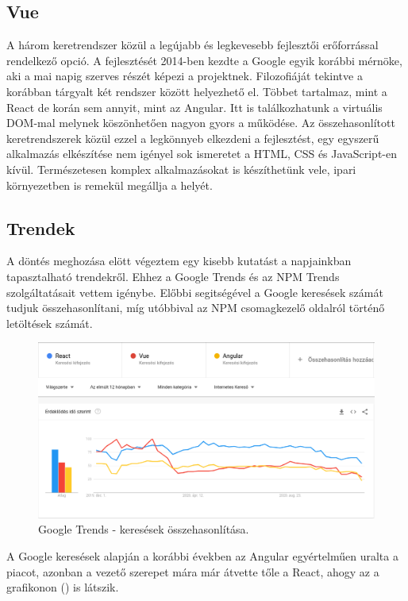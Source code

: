 \subsection{Vue}
A három keretrendszer közül a legújabb és legkevesebb fejlesztői erőforrással rendelkező opció.
A fejlesztését 2014-ben kezdte a Google egyik korábbi mérnöke, aki a mai napig szerves részét képezi a projektnek.
Filozofiáját tekintve a korábban tárgyalt két rendszer között helyezhető el. Többet tartalmaz, mint a React de korán sem annyit, mint az Angular. Itt is találkozhatunk a virtuális DOM-mal melynek köszönhetően nagyon gyors a működése.
Az összehasonlított keretrendszerek közül ezzel a legkönnyeb elkezdeni a fejlesztést, egy egyszerű alkalmazás elkészítése nem igényel sok ismeretet a HTML, CSS és JavaScript-en kívül. Természetesen komplex alkalmazásokat is készíthetünk vele, ipari környezetben is remekül megállja a helyét. 

\subsection{Trendek}
A döntés meghozása elött végeztem egy kisebb kutatást a napjainkban tapasztalható trendekről. Ehhez a Google Trends és az NPM Trends szolgáltatásait vettem igénybe. Előbbi segitségével a Google keresések számát tudjuk összehasonlítani, míg utóbbival az NPM csomagkezelő oldalról történő letöltések számát.

\begin{figure}[!ht]
  \centering
  \includegraphics[width=150mm, keepaspectratio]{figures/google_trends.png}
  \caption{Google Trends - keresések összehasonlítása.}
  \label{fig:GoogleTrends}
\end{figure}

A Google keresések alapján a korábbi években az Angular egyértelműen uralta a piacot, azonban a vezető szerepet mára már átvette tőle a React, ahogy az a grafikonon () is látszik.

